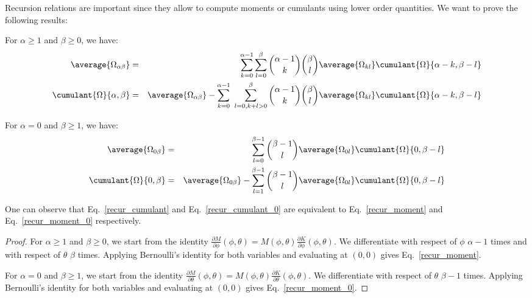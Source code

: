 Recursion relations are important since they allow to compute moments or cumulants using lower order quantities. We want to prove the following results:

\begin{theorem}
    For $\alpha \ge 1$ and $\beta \ge 0$, we have:
    \begin{eqnarray}
        \label{recur_moment}
        \average{\Omega_{\alpha \beta}} &=& \sum_{k = 0}^{\alpha - 1}  \sum_{l = 0}^{\beta}  \binom{\alpha - 1}{k} \binom{\beta}{l} \average{\Omega_{k l}} \cumulant{\Omega}{{\alpha - k, \beta - l}}\\
        \label{recur_cumulant}
        \cumulant{\Omega}{{\alpha, \beta}} &=&\average{\Omega_{\alpha \beta}} - \sum_{k = 0}^{\alpha - 1} \  \sum_{l = 0, k+l > 0}^{\beta}  \binom{\alpha - 1}{k} \binom{\beta}{l} \average{\Omega_{k l}} \cumulant{\Omega}{{\alpha - k, \beta - l}}
    \end{eqnarray}

    For $\alpha = 0$ and $\beta \ge 1$, we have:
    \begin{eqnarray}
        \label{recur_moment_0}
        \average{\Omega_{0 \beta}} &=& \sum_{l = 0}^{\beta-1}  \binom{\beta - 1}{l} \average{\Omega_{0 l}} \cumulant{\Omega}{{0, \beta - l}}\\
        \label{recur_cumulant_0}
        \cumulant{\Omega}{{0, \beta}} &=&\average{\Omega_{0 \beta}} - \sum_{l = 1}^{\beta-1}  \binom{\beta - 1}{l} \average{\Omega_{0 l}} \cumulant{\Omega}{{0, \beta - l}}
    \end{eqnarray}
\end{theorem}

One can observe that Eq.~\ref{recur_cumulant} and Eq.~\ref{recur_cumulant_0} are equivalent to Eq.~\ref{recur_moment} and Eq.~\ref{recur_moment_0} respectively.

\begin{proof}
    For $\alpha \ge 1$ and $\beta \ge 0$, we start from the identity $\frac{\partial M}{\partial \phi}(\phi, \theta) = M(\phi, \theta) \frac{\partial K}{\partial \phi}(\phi, \theta)$. We differentiate with respect of $\phi$ $\alpha - 1$ times and with respect of $\theta$ $\beta$ times. Applying Bernoulli's identity for both variables and evaluating at $(0,0)$ gives Eq.~\ref{recur_moment}.

    For $\alpha = 0$ and $\beta \ge 1$, we start from the identity $\frac{\partial M}{\partial \theta}(\phi, \theta) = M(\phi, \theta) \frac{\partial K}{\partial \theta}(\phi, \theta)$. We differentiate with respect of $\theta$ $\beta- 1$ times. Applying Bernoulli's identity for both variables and evaluating at $(0,0)$ gives Eq.~\ref{recur_moment_0}.
\end{proof}

